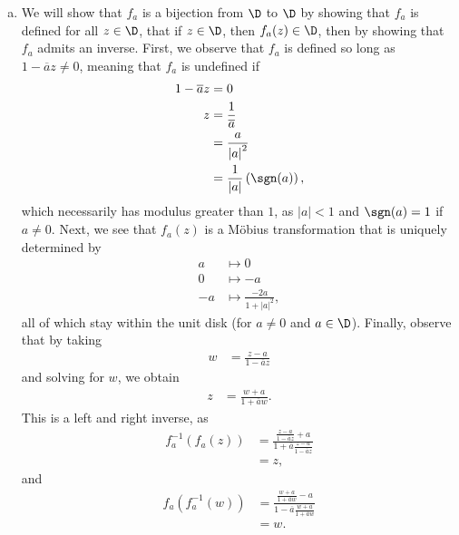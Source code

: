 \documentclass[10pt]{mypackage}
\begin{document}
\begin{solution}\hfill
  \begin{enumerate}[(a)]
    \item We will show that $f_a$ is a bijection from $\D$ to $\D$ by showing that $f_a$ is defined for all $z\in \D$, that if $z\in \D$, then $f_a(z) \in \D$, then by showing that $f_a$ admits an inverse. First, we observe that $f_a$ is defined so long as $1- \overline{a}z \neq 0$, meaning that $f_a$ is undefined if
      \begin{align*}
        1- \overline{a}z &= 0\\
        z &= \frac{1}{ \overline{a} }\\
          &= \frac{a}{\left\vert a \right\vert^2}\\
          &= \frac{1}{\left\vert a \right\vert} \left( \sgn(a) \right),
      \end{align*}
      which necessarily has modulus greater than $1$, as $\left\vert a \right\vert < 1$ and $\sgn(a) = 1$ if $a \neq 0$. Next, we see that $f_a(z)$ is a Möbius transformation that is uniquely determined by
      \begin{align*}
        a &\mapsto 0\\
        0 &\mapsto -a\\
        -a &\mapsto \frac{-2a}{1 + \left\vert a \right\vert^2},
      \end{align*}
      all of which stay within the unit disk (for $a\neq 0$ and $a\in \D$). Finally, observe that by taking
      \begin{align*}
        w &= \frac{z-a}{1- \overline{a}z}
      \end{align*}
      and solving for $w$, we obtain
      \begin{align*}
        z &= \frac{w+a}{1 + \overline{a}w}.
      \end{align*}
      This is a left and right inverse, as
      \begin{align*}
        f_a^{-1}\left( f_a(z) \right) &= \frac{\frac{z-a}{1- \overline{a}z} + a}{1 + \overline{a}\frac{z-a}{1- \overline{a}z}}\\
                                      &= z,
      \end{align*}
      and
      \begin{align*}
        f_a\left( f_a^{-1}\left( w \right) \right) &= \frac{\frac{w+a}{1 + \overline{a}w} - a}{1 - \overline{a}\frac{w+a}{1 + \overline{a}w}}\\
                                                   &= w.
      \end{align*}

\end{enumerate}
\end{solution}
\end{document}
